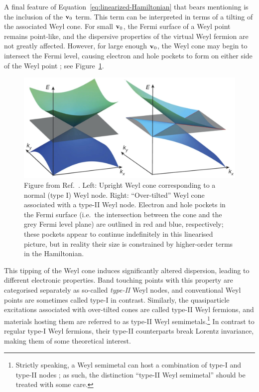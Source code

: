 A final feature of Equation~\eqref{eq:linearized-Hamiltonian} that bears mentioning is the inclusion of the $\vb{v}_0$ term. This term can be interpreted in terms of a tilting of the associated Weyl cone. For small $\vb{v}_0$, the Fermi surface of a Weyl point remains point-like, and the dispersive properties of the virtual Weyl fermion are not greatly affected. However, for large enough $\vb{v}_0$, the Weyl cone may begin to intersect the Fermi level, causing electron and hole pockets to form on either side of the Weyl point \cite{Soluyanov_Type-II}; see Figure~\ref{fig:Weyl-cone-tilt}.
\begin{figure}[htb!]
	\centering
	\includegraphics[width=.7\linewidth]{Images/Weyl-cone-tilt}
	\caption{Figure from Ref.~\cite{Soluyanov_Type-II}. Left: Upright Weyl cone corresponding to a normal (type I) Weyl node. Right: ``Over-tilted'' Weyl cone associated with a type-II Weyl node. Electron and hole pockets in the Fermi surface (i.e.\ the intersection between the cone and the grey Fermi level plane) are outlined in red and blue, respectively; these pockets appear to continue indefinitely in this linearised picture, but in reality their size is constrained by higher-order terms in the Hamiltonian.}
	\label{fig:Weyl-cone-tilt}
\end{figure}
This tipping of the Weyl cone induces significantly altered dispersion, leading to different electronic properties. Band touching points with this property are categorised separately as so-called \emph{type-II} Weyl nodes, and conventional Weyl points are sometimes called type-I in contrast. Similarly, the quasiparticle excitations associated with over-tilted cones are called type-II Weyl fermions, and materials hosting them are referred to as type-II Weyl semimetals.\footnote{
	Strictly speaking, a Weyl semimetal can host a combination of type-I and type-II nodes \cite{Zhang_type-I-II}; as such, the distinction ``type-II Weyl semimetal'' should be treated with some care.}
In contrast to regular type-I Weyl fermions, their type-II counterparts break Lorentz invariance, making them of some theoretical interest.

